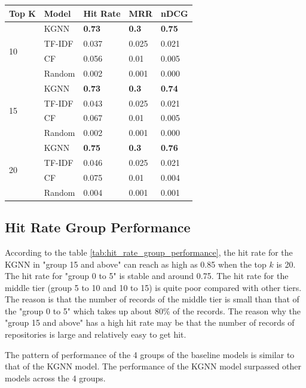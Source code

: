 \documentclass[11pt,twoside]{report}
\begin{document}
\begin{center}
    \begin{tabular}{l | l | l | l | l}
    \hline
    Top K & Model & Hit Rate & MRR & nDCG \\
    \hline
    \multirow{4}{*}{10} 
    & KGNN & \textbf{0.73} & \textbf{0.3} & \textbf{0.75} \\
    & TF-IDF & 0.037 & 0.025 & 0.021 \\
    & CF & 0.056 & 0.01 & 0.005 \\
    & Random & 0.002 & 0.001 & 0.000 \\
    \hline
    \multirow{4}{*}{15}
    & KGNN & \textbf{0.73} & \textbf{0.3} & \textbf{0.74} \\
    & TF-IDF & 0.043 & 0.025 & 0.021 \\
    & CF & 0.067 & 0.01 & 0.005 \\
    & Random & 0.002 & 0.001 & 0.000 \\
    \hline
    \multirow{4}{*}{20}
    & KGNN & \textbf{0.75} & \textbf{0.3} & \textbf{0.76} \\
    & TF-IDF & 0.046 & 0.025 & 0.021 \\
    & CF & 0.075 & 0.01 & 0.004 \\
    & Random & 0.004 & 0.001 & 0.001 \\
    \end{tabular}
    \label{tab:overall_performance}
\end{center}

\subsection{Hit Rate Group Performance}
According to the table \ref{tab:hit_rate_group_performance}, the hit rate for the KGNN in "group 15 and above" can reach as high as 0.85 when the top $k$ is 20. The hit rate for "group 0 to 5" is stable and around 0.75. The hit rate for the middle tier (group 5 to 10 and 10 to 15) is quite poor compared with other tiers. The reason is that the number of records of the middle tier is small than that of the "group 0 to 5" which takes up about 80\% of the records. The reason why the "group 15 and above" has a high hit rate may be that the number of records of repositories is large and relatively easy to get hit.

The pattern of performance of the 4 groups of the baseline models is similar to that of the KGNN model. The performance of the KGNN model surpassed other models across the 4 groups.
\end{document}
